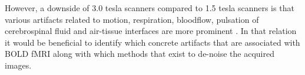 However, a downside of 3.0 tesla scanners compared to 1.5 tesla scanners is that various artifacts related to motion, respiration, bloodflow, pulsation of cerebrospinal fluid and air-tissue interfaces are more prominent \cite{Wood2012}. In that relation it would be beneficial to identify which concrete artifacts that are associated with BOLD fMRI along with which methods that exist to de-noise the acquired images.   
